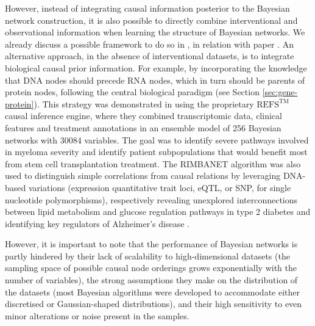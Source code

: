 However, instead of integrating causal information posterior to the Bayesian network construction, it is also possible to directly combine interventional and observational information when learning the structure of Bayesian networks. We already discuss a possible framework to do so in , in relation with paper \autocite{rau_etal13}. An alternative approach, in the absence of interventional datasets, is to integrate biological causal prior information. For example, by incorporating the knowledge that DNA nodes should precede RNA nodes, which in turn should be parents of protein nodes, following the central biological paradigm (see Section \ref{sec:gene-protein}). This strategy was demonstrated in \autocite{gruber_etal16} using the proprietary $\text{REFS}^{\text{TM}}$ causal inference engine, where they combined transcriptomic data, clinical features and treatment annotations in an ensemble model of 256 Bayesian networks with \num{30084} variables. The goal was to identify severe pathways involved in myeloma severity and identify patient subpopulations that would benefit most from stem cell transplantation treatment. The RIMBANET algorithm was also used to distinguish simple correlations from causal relations by leveraging DNA-based variations (expression quantitative trait loci, eQTL, or SNP, for single nucleotide polymorphisms), respectively revealing unexplored interconnections between lipid metabolism and glucose regulation pathways in type 2 diabetes \autocite{cohain_etal21} and identifying key regulators of Alzheimer’s disease \autocite{beckmann_etal20}.

However, it is important to note that the performance of Bayesian networks is partly hindered by their lack of scalability to high-dimensional datasets (the sampling space of possible causal node orderings grows exponentially with the number of variables), the strong assumptions they make on the distribution of the datasets (most Bayesian algorithms were developed to accommodate either discretised or Gaussian-shaped distributions), and their high sensitivity to even minor alterations or noise present in the samples.

